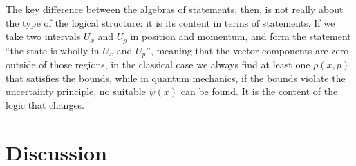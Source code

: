 \documentclass[11pt, executivepaper]{article}
\begin{document}
The key difference between the algebras of statements, then, is not really about the type of the logical structure: it is its content in terms of statements. If we take two intervals $U_x$ and $U_p$ in position and momentum, and form the statement ``the state is wholly in $U_x$ and $U_p$'', meaning that the vector components are zero outside of those regions, in the classical case we always find at least one $\rho(x,p)$ that satisfies the bounds, while in quantum mechanics, if the bounds violate the uncertainty principle, no suitable $\psi(x)$ can be found. It is the content of the logic that changes. 

\section{Discussion}
\label{Discussion}
%
%
%
%
%
%
%
%
%
%
\end{document}
